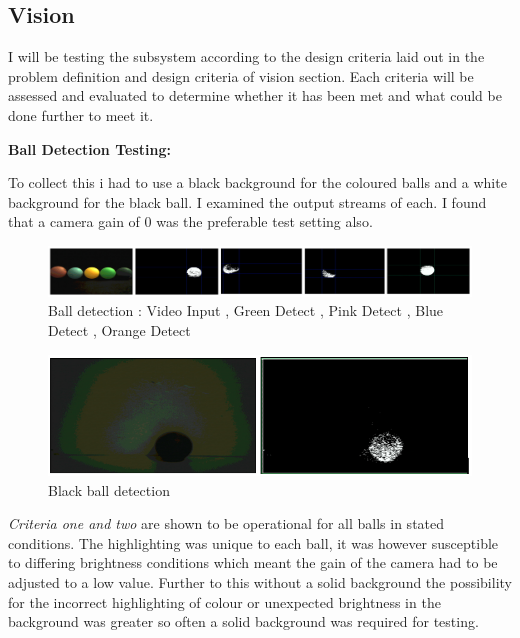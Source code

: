 \documentclass[10pt,twoside]{article}
\begin{document}
\newpage

\subsection{Vision}
I will be testing the subsystem according to the design criteria laid out in the problem definition and design criteria of vision section. Each criteria will be assessed and evaluated to determine whether it has been met and what could be done further to meet it. 

\textbf{Ball Detection Testing: }

To collect this i had to use a black background for the coloured balls and a white background for the black ball. I examined the output streams of each. I found that a camera gain of 0 was the preferable test setting also. 

\begin{figure}[hbt!]
    \centering
    \includegraphics[scale=0.6]{BallDetectNon.PNG}
    \captionsetup{justification=centering}
    \caption{Ball detection : Video Input , Green Detect , Pink Detect , Blue Detect , Orange Detect}
\end{figure}


\begin{figure}[hbt!]
    \centering
    \includegraphics[scale=0.4]{BlackBallDetect.PNG}
    \captionsetup{justification=centering}
    \caption{Black ball detection}
\end{figure}

\textit{Criteria one and two} are shown to be operational for all balls in stated conditions. The highlighting was unique to each ball, it was however susceptible to differing brightness conditions which meant the gain of the camera had to be adjusted to a low value. Further to this without a solid background the possibility for the incorrect highlighting of colour or unexpected brightness in the background was greater so often a solid background was required for testing. 
\end{document}
